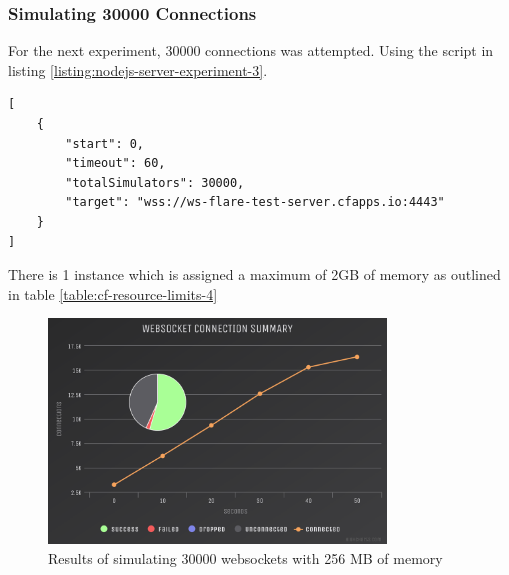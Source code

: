 \subsubsection{Simulating 30000 Connections}

For the next experiment, 30000 connections was attempted. Using the script in listing \ref{listing:nodejs-server-experiment-3}.

\begin{listing}[H]
    \caption{WS-Flare test script for simulating 30000 users}
    \label{listing:nodejs-server-experiment-3}
    \begin{verbatim}
[
    {
        "start": 0,
        "timeout": 60,
        "totalSimulators": 30000,
        "target": "wss://ws-flare-test-server.cfapps.io:4443"
    }
]
\end{verbatim}
\end{listing}

There is 1 instance which is assigned a maximum of 2GB of memory as outlined in table \ref{table:cf-resource-limits-4}

\begin{table}[H]
\caption{Cloud Foundry Resource Limits}
\label{table:cf-resource-limits-4}
\end{table}

\begin{figure}[H]
  \centering
    \includegraphics[width=0.8\textwidth]{figures/experiments/experiment-1/node-js/conn-summary-30000-256-memory.png}
    \caption{Results of simulating 30000 websockets with 256 MB of memory}
    \label{fig:experiment-3-conn-summary-5000-1-instances-256-mem}
\end{figure}

